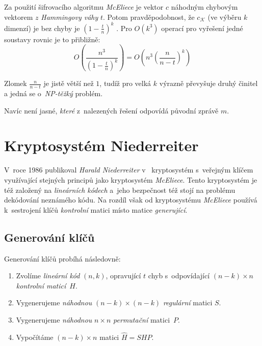 \documentclass[thesis=M,czech,hidelinks]{FITthesis}[2012/06/26]
\newcommand{\0}{{\textcolor[gray]{0.75}{0}}}
\begin{document}
Za použití šifrovacího algoritmu \emph{McEliece} je vektor $c$ 
náhodným chybovým vektorem $z$ \emph{Hammingovy váhy} $t$. Potom
pravděpodobnost, že $c_{\mathcal{K}}$ (ve výběru $k$ dimenzí) je bez chyby je
$\left(1-\frac{t}{n}\right)^k$ \cite{McEliece}. Pro $O\left(k^3\right)$ operací
pro vyřešení jedné soustavy rovnic je to přibližně:
$$
    O\left( \frac{n^3}{\left(1-\frac{t}{n}\right)^k} \right) =
    O\left( n^3 \left(\frac{n}{n-t}\right)^k \right)
$$

Zlomek $\frac{n}{n-t}$ je jistě větší než $1$, tudíž pro velká $k$ výrazně
převyšuje druhý činitel a jedná se o~\emph{NP-těžký} problém.

Navíc není jasné, \emph{které} z~nalezených řešení odpovídá původní zprávě $m$.


\section{Kryptosystém Niederreiter}\label{kap_niederreiter}

V~roce 1986 publikoval \emph{Harald Niederreiter} v~\cite{Niederreiter}
kryptosystém s~veřejným klíčem využívající stejných principů jako kryptosystém
\emph{McEliece}. Tento kryptosystém je též založený na \emph{lineárních kódech}
a~jeho bezpečnost též stojí na problému dekódování neznámého kódu. Na rozdíl
však od kryptosystému \emph{McEliece} používá k~sestrojení klíčů
\emph{kontrolní} matici místo matice \emph{generující}.

\subsection{Generování klíčů}

Generování klíčů probíhá následovně:

\begin{enumerate}
    \item Zvolíme \emph{lineární kód} $(n,k)$, opravující $t$ chyb
        s~odpovídající $(n-k) \times n$ \emph{kontrolní maticí}~$H$.
    \item Vygenerujeme \emph{náhodnou} $(n-k) \times (n-k)$ \emph{regulární}
        matici $S$.
    \item Vygenerujeme \emph{náhodnou} $n \times n$ \emph{permutační}
        matici~$P$.
    \item Vypočítáme $(n-k) \times n$ matici $\hat{H} = S H P$.
\end{enumerate}
\end{document}
